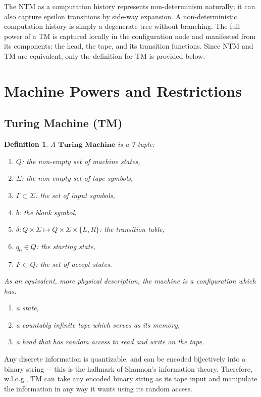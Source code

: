 \documentclass[12pt]{article}  %
\newtheorem{definition}{Definition}
\begin{document}
The NTM as a computation history represents non-determinism naturally; it can also capture epsilon transitions by side-way expansion. A non-deterministic computation history is simply a degenerate tree without branching. The full power of a TM is captured locally in the configuration node and manifested from its components: the head, the tape, and its transition functions. Since NTM and TM are equivalent, only the definition for TM is provided below.




\section{Machine Powers and Restrictions}

\subsection{Turing Machine (TM)}

\begin{definition}
A $\textbf{Turing Machine}$ is a 7-tuple:
\begin{enumerate}
	\item $Q$: the non-empty set of machine states,
	\item $\Sigma$: the non-empty set of tape symbols,
	\item $\Gamma \subset \Sigma$: the set of input symbols,
	\item $b$: the blank symbol,
	\item $\delta: Q \times \Sigma \mapsto Q \times \Sigma \times \{L, R\} $: the transition table,
	\item $q_0 \in Q$: the starting state,
	\item $F \subset Q$: the set of accept states.
\end{enumerate}

As an equivalent, more physical description, the machine is a configuration which has:
\begin{enumerate}
	\item a state,
	\item a countably infinite tape which serves as its memory,
	\item a head that has random access to read and write on the tape.
\end{enumerate}
\end{definition}


Any discrete information is quantizable, and can be encoded bijectively into a binary string $-$ this is the hallmark of Shannon's information theory. Therefore, w.l.o.g., TM can take any encoded binary string as its tape input and manipulate the information in any way it wants using its random access. 
\end{document}

